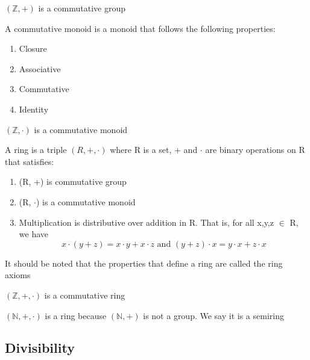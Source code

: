 \documentclass{article}
\begin{document}
\begin{lemma}
    $ (\mathbb{Z} , +) $ is a commutative group
\end{lemma}

\begin{definition}
    A commutative monoid is a monoid that follows the following properties:
    \begin{enumerate}
	\item Closure
	\item Associative
	\item Commutative
	\item Identity
    \end{enumerate}
\end{definition}

\begin{lemma}
    $ (\mathbb{Z} , \cdot) $ is a commutative monoid
\end{lemma}

\begin{definition}[Ring]
    A ring is a triple $ (R,+, \cdot) $ where R is a set, + and $ \cdot $ are binary
    operations on R that satisfies:
    \begin{enumerate}
	\item (R, +) is commutative group
	\item (R, $ \cdot $) is a commutative monoid
	\item Multiplication is distributive over addition in R. That is, for all
	    x,y,z $\in $ R, we have
	    $$ x \cdot (y+z) = x \cdot y + x \cdot z \text{ and }
	    (y+z) \cdot x = y \cdot x + z \cdot x $$
    \end{enumerate}

    It should be noted that the properties that define a ring are called the ring axioms
\end{definition}

\begin{lemma}
    $ (\mathbb{Z} , +, \cdot) $ is a commutative ring
\end{lemma}

\begin{lemma}
    $ (\mathbb{N} , +, \cdot) $ is a ring because $ (\mathbb{N} , +) $ is not a group.
    We say it is a semiring
\end{lemma}

\subsection{Divisibility}
\end{document}
